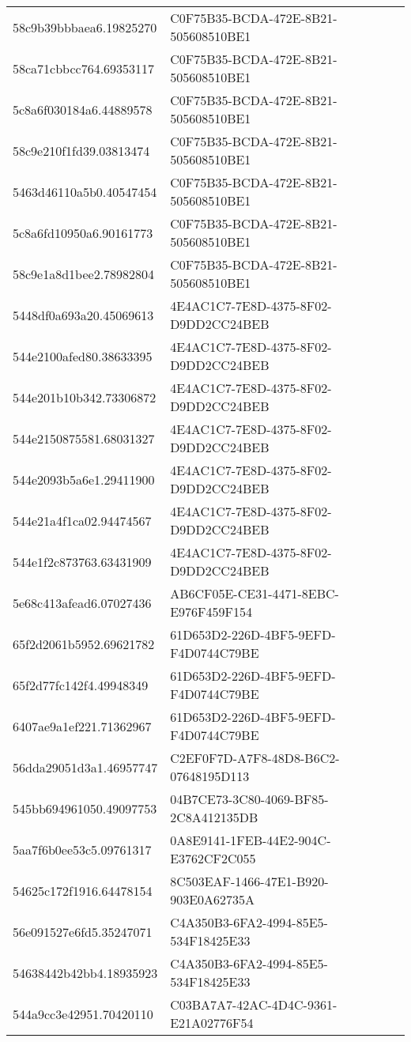\begin{tabular}{ll}
58c9b39bbbaea6.19825270 & C0F75B35-BCDA-472E-8B21-505608510BE1 \\
58ca71cbbcc764.69353117 & C0F75B35-BCDA-472E-8B21-505608510BE1 \\
5c8a6f030184a6.44889578 & C0F75B35-BCDA-472E-8B21-505608510BE1 \\
58c9e210f1fd39.03813474 & C0F75B35-BCDA-472E-8B21-505608510BE1 \\
5463d46110a5b0.40547454 & C0F75B35-BCDA-472E-8B21-505608510BE1 \\
5c8a6fd10950a6.90161773 & C0F75B35-BCDA-472E-8B21-505608510BE1 \\
58c9e1a8d1bee2.78982804 & C0F75B35-BCDA-472E-8B21-505608510BE1 \\
5448df0a693a20.45069613 & 4E4AC1C7-7E8D-4375-8F02-D9DD2CC24BEB \\
544e2100afed80.38633395 & 4E4AC1C7-7E8D-4375-8F02-D9DD2CC24BEB \\
544e201b10b342.73306872 & 4E4AC1C7-7E8D-4375-8F02-D9DD2CC24BEB \\
544e2150875581.68031327 & 4E4AC1C7-7E8D-4375-8F02-D9DD2CC24BEB \\
544e2093b5a6e1.29411900 & 4E4AC1C7-7E8D-4375-8F02-D9DD2CC24BEB \\
544e21a4f1ca02.94474567 & 4E4AC1C7-7E8D-4375-8F02-D9DD2CC24BEB \\
544e1f2c873763.63431909 & 4E4AC1C7-7E8D-4375-8F02-D9DD2CC24BEB \\
5e68c413afead6.07027436 & AB6CF05E-CE31-4471-8EBC-E976F459F154 \\
65f2d2061b5952.69621782 & 61D653D2-226D-4BF5-9EFD-F4D0744C79BE \\
65f2d77fc142f4.49948349 & 61D653D2-226D-4BF5-9EFD-F4D0744C79BE \\
6407ae9a1ef221.71362967 & 61D653D2-226D-4BF5-9EFD-F4D0744C79BE \\
56dda29051d3a1.46957747 & C2EF0F7D-A7F8-48D8-B6C2-07648195D113 \\
545bb694961050.49097753 & 04B7CE73-3C80-4069-BF85-2C8A412135DB \\
5aa7f6b0ee53c5.09761317 & 0A8E9141-1FEB-44E2-904C-E3762CF2C055 \\
54625c172f1916.64478154 & 8C503EAF-1466-47E1-B920-903E0A62735A \\
56e091527e6fd5.35247071 & C4A350B3-6FA2-4994-85E5-534F18425E33 \\
54638442b42bb4.18935923 & C4A350B3-6FA2-4994-85E5-534F18425E33 \\
544a9cc3e42951.70420110 & C03BA7A7-42AC-4D4C-9361-E21A02776F54 \\

\end{tabular}
